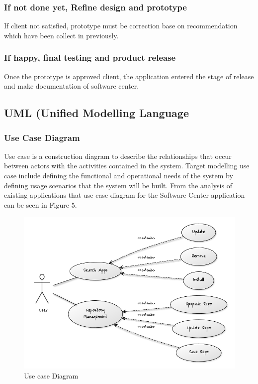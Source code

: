 \documentclass[conference, letterpaper]{IEEEtran}
\begin{document}
\subsubsection{If not done yet, Refine design and prototype}
If client not satisfied, prototype must be correction base on recommendation which have been collect in previously.

\subsubsection{If happy, final testing and product release}
Once the prototype is approved client, the application entered the stage of release and make documentation of software center. 

\subsection{UML (Unified Modelling Language}

\subsubsection{Use Case Diagram}
Use case is a construction diagram to describe the relationships that occur between actors with the activities contained in the system. Target modelling use case include defining the functional and operational needs of the system by defining usage scenarios that the system will be built. From the analysis of existing applications that use case diagram for the Software Center application can be seen in Figure 5.

\begin{figure}[!t]
\centering
\includegraphics[scale=0.42]{image/Usecase.png}
\caption{Use case Diagram}
\end{figure}
\end{document}

